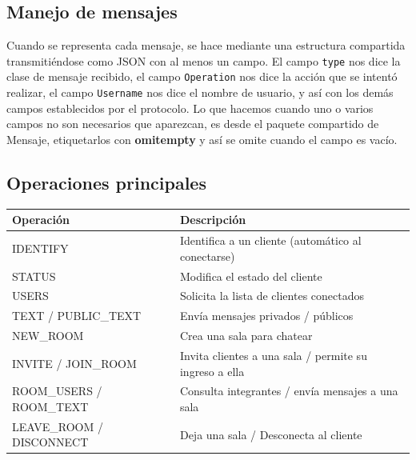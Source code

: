 \documentclass[12pt,a4paper]{article}
\begin{document}
\subsection*{Manejo de mensajes}
Cuando se representa cada mensaje, se hace mediante una estructura compartida
transmitiéndose como JSON con al menos un campo. El campo \texttt{type} nos dice
la clase de mensaje recibido, el campo \texttt{Operation} nos dice la acción
que se intentó realizar, el campo \texttt{Username} nos dice el nombre de usuario, y así con los demás campos establecidos por el protocolo.
Lo que hacemos cuando uno o varios campos no son necesarios que aparezcan, es
desde el paquete compartido de Mensaje, etiquetarlos con \textbf{omitempty} y así
se omite cuando el campo es vacío.

\subsection*{Operaciones principales}
\noindent\begin{tabularx}{\textwidth}{|>{\ttfamily}p{}|X|}
\hline
\textnormal{\textbf{Operación}} & \textbf{Descripción}\\
\hline
IDENTIFY & Identifica a un cliente (automático al conectarse)\\
STATUS & Modifica el estado del cliente\\
USERS & Solicita la lista de clientes conectados\\
TEXT / PUBLIC\_TEXT & Envía mensajes privados / públicos\\
NEW\_ROOM & Crea una sala para chatear\\
INVITE / JOIN\_ROOM & Invita clientes a una sala / permite su ingreso a ella\\
ROOM\_USERS / ROOM\_TEXT & Consulta integrantes / envía mensajes a una sala\\
LEAVE\_ROOM / DISCONNECT & Deja una sala / Desconecta al cliente\\
\hline
\end{tabularx}
\end{document}
